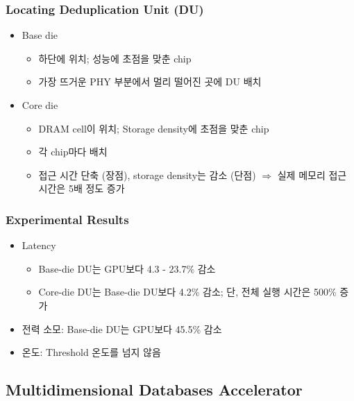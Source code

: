 \subsubsection*{Locating Deduplication Unit (DU)}
\begin{itemize}
    \item Base die
    \begin{itemize}
        \item 하단에 위치; 성능에 초점을 맞춘 chip
        \item 가장 뜨거운 PHY 부분에서 멀리 떨어진 곳에 DU 배치
    \end{itemize}
    \item Core die
    \begin{itemize}
        \item DRAM cell이 위치; Storage density에 초점을 맞춘 chip
        \item 각 chip마다 배치
        \item 접근 시간 단축 (장점), storage density는 감소 (단점) $\Rightarrow$ 실제 메모리 접근 시간은 5배 정도 증가
    \end{itemize}
\end{itemize}

\subsubsection*{Experimental Results}
\begin{itemize}
    \item Latency
    \begin{itemize}
        \item Base-die DU는 GPU보다 4.3 - 23.7\% 감소
        \item Core-die DU는 Base-die DU보다 4.2\% 감소; 단, 전체 실행 시간은 500\% 증가
    \end{itemize}
    \item 전력 소모: Base-die DU는 GPU보다 45.5\% 감소
    \item 온도: Threshold 온도를 넘지 않음
\end{itemize}
\newpage

\subsection{Multidimensional Databases Accelerator}

